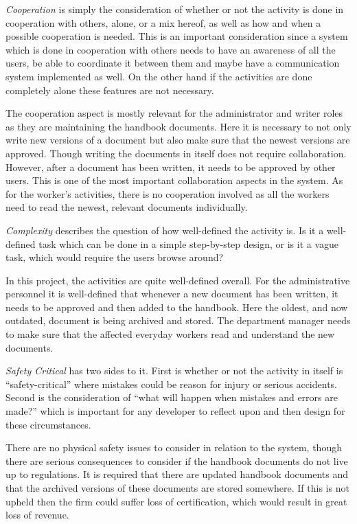 \textit{Cooperation} is simply the consideration of whether or not the activity is done in cooperation with others, alone, or a mix hereof, as well as how and when a possible cooperation is needed.
This is an important consideration since a system which is done in cooperation with others needs to have an awareness of all the users, be able to coordinate it between them and maybe have a communication system implemented as well.
On the other hand if the activities are done completely alone these features are not necessary.

The cooperation aspect is mostly relevant for the administrator and writer roles as they are maintaining the handbook documents.
Here it is necessary to not only write new versions of a document but also make sure that the newest versions are approved.
Though writing the documents in itself does not require collaboration. However, after a document has been written, it needs to be approved by other users. This is one of the most important collaboration aspects in the system.
As for the worker's activities, there is no cooperation involved as all the workers need to read the newest, relevant documents individually.

\textit{Complexity} describes the question of how well-defined the activity is.
Is it a well-defined task which can be done in a simple step-by-step design,
or is it a vague task, which would require the users browse around?

In this project, the activities are quite well-defined overall.
For the administrative personnel it is well-defined that whenever a new document has been written, it needs to be approved and then added to the handbook.
Here the oldest, and now outdated, document is being archived and stored.
The department manager needs to make sure that the affected everyday workers read and understand the new documents.

\textit{Safety Critical} has two sides to it.
First is whether or not the activity in itself is ``safety-critical'' where mistakes could be reason for injury or serious accidents.
Second is the consideration of ``what will happen when mistakes and errors are made?'' which is important for any developer to reflect upon and then design for these circumstances.

There are no physical safety issues to consider in relation to the system, though there are serious consequences to consider if the handbook documents do not live up to regulations.
It is required that there are updated handbook documents and that the archived versions of these documents are stored somewhere.
If this is not upheld then the firm could suffer loss of certification, which would result in great loss of revenue.

